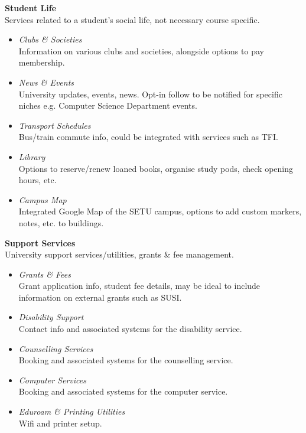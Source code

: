 \textbf{Student Life} \\
Services related to a student's social life, not necessary course specific.
\begin{itemize}
  \item \textit{Clubs \& Societies}\\
         Information on various clubs and societies, alongside options to pay membership.
  \item \textit{News \& Events}\\
         University updates, events, news. Opt-in follow to be notified for specific niches e.g. Computer Science Department events. 
  \item \textit{Transport Schedules}\\
        Bus/train commute info, could be integrated with services such as TFI.
  \item \textit{Library}\\
        Options to reserve/renew loaned books, organise study pods, check opening hours, etc.
  \item \textit{Campus Map}\\
        Integrated Google Map of the SETU campus, options to add custom markers, notes, etc. to buildings.
  \end{itemize}
\textbf{Support Services} \\
University support services/utilities, grants \& fee management. 
\begin{itemize}
  \item \textit{Grants \& Fees}\\
        Grant application info, student fee details, may be ideal to include information on external grants such as SUSI. 
  \item \textit{Disability Support}\\
        Contact info and associated systems for the disability service.
 \item \textit{Counselling Services}\\
        Booking and associated systems for the counselling service.
  \item \textit{Computer Services}\\
        Booking and associated systems for the computer service.
   \item \textit{Eduroam \& Printing Utilities}\\
        Wifi and printer setup.
  \end{itemize}

